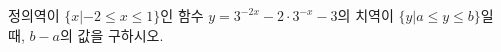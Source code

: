 정의역이 $\{x|-2\le x\le 1\}$인 함수 $y=3^{-2x}-2\cdot 3^{-x}-3$의 치역이 $\{y|a\le y\le b\}$일 때, $b-a$의 값을 구하시오.
